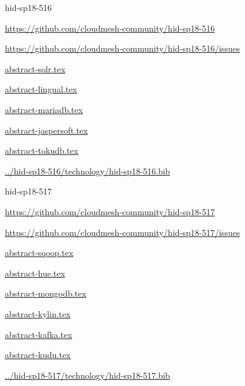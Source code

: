 \begin{IU}

hid-sp18-516

\url{https://github.com/cloudmesh-community/hid-sp18-516}

\url{https://github.com/cloudmesh-community/hid-sp18-516/issues}

\href{https://github.com/cloudmesh-community/hid-sp18-516/blob/master//technology/abstract-solr.tex}{abstract-solr.tex}

\href{https://github.com/cloudmesh-community/hid-sp18-516/blob/master//technology/abstract-lingual.tex}{abstract-lingual.tex}

\href{https://github.com/cloudmesh-community/hid-sp18-516/blob/master//technology/abstract-mariadb.tex}{abstract-mariadb.tex}

\href{https://github.com/cloudmesh-community/hid-sp18-516/blob/master//technology/abstract-jaspersoft.tex}{abstract-jaspersoft.tex}

\href{https://github.com/cloudmesh-community/hid-sp18-516/blob/master//technology/abstract-tokudb.tex}{abstract-tokudb.tex}

\href{https://github.com/cloudmesh-community/hid-sp18-516/blob/master//technology/hid-sp18-516.bib}{../hid-sp18-516/technology/hid-sp18-516.bib}

\end{IU}


\begin{IU}

hid-sp18-517

\url{https://github.com/cloudmesh-community/hid-sp18-517}

\url{https://github.com/cloudmesh-community/hid-sp18-517/issues}

\href{https://github.com/cloudmesh-community/hid-sp18-517/blob/master//technology/abstract-sqoop.tex}{abstract-sqoop.tex}

\href{https://github.com/cloudmesh-community/hid-sp18-517/blob/master//technology/abstract-hue.tex}{abstract-hue.tex}

\href{https://github.com/cloudmesh-community/hid-sp18-517/blob/master//technology/abstract-mongodb.tex}{abstract-mongodb.tex}

\href{https://github.com/cloudmesh-community/hid-sp18-517/blob/master//technology/abstract-kylin.tex}{abstract-kylin.tex}

\href{https://github.com/cloudmesh-community/hid-sp18-517/blob/master//technology/abstract-kafka.tex}{abstract-kafka.tex}

\href{https://github.com/cloudmesh-community/hid-sp18-517/blob/master//technology/abstract-kudu.tex}{abstract-kudu.tex}

\href{https://github.com/cloudmesh-community/hid-sp18-517/blob/master//technology/hid-sp18-517.bib}{../hid-sp18-517/technology/hid-sp18-517.bib}

\end{IU}


